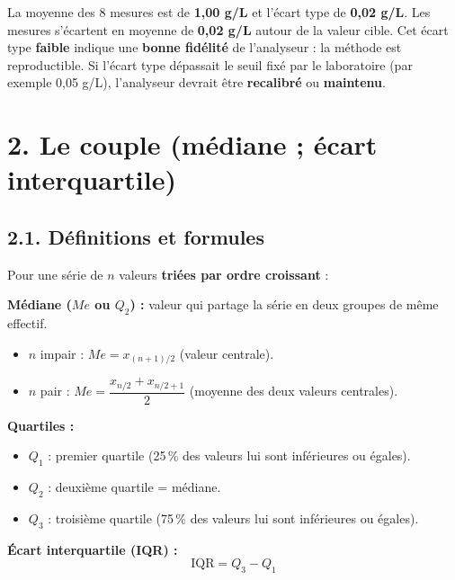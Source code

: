 \documentclass[11pt,a4paper]{article}
\begin{document}
\begin{interpretation}
La moyenne des 8 mesures est de \textbf{1,00 g/L} et l'écart type de \textbf{0,02 g/L}. Les mesures s'écartent en moyenne de \textbf{0,02 g/L} autour de la valeur cible. Cet écart type \textbf{faible} indique une \textbf{bonne fidélité} de l'analyseur : la méthode est reproductible. Si l'écart type dépassait le seuil fixé par le laboratoire (par exemple 0,05 g/L), l'analyseur devrait être \textbf{recalibré} ou \textbf{maintenu}.
\end{interpretation}

\newpage

\section*{2. Le couple (médiane ; écart interquartile)}

\subsection*{2.1. Définitions et formules}

\begin{rappel}
Pour une série de $n$ valeurs \textbf{triées par ordre croissant} :

\vspace{0.2cm}
\textbf{Médiane ($Me$ ou $Q_2$) :} valeur qui partage la série en deux groupes de même effectif.
\begin{itemize}[leftmargin=*]
  \item $n$ impair : $Me = x_{(n+1)/2}$ (valeur centrale).
  \item $n$ pair : $Me = \dfrac{x_{n/2} + x_{n/2+1}}{2}$ (moyenne des deux valeurs centrales).
\end{itemize}

\vspace{0.2cm}
\textbf{Quartiles :}
\begin{itemize}[leftmargin=*]
  \item $Q_1$ : premier quartile (25\,\% des valeurs lui sont inférieures ou égales).
  \item $Q_2$ : deuxième quartile = médiane.
  \item $Q_3$ : troisième quartile (75\,\% des valeurs lui sont inférieures ou égales).
\end{itemize}

\vspace{0.2cm}
\textbf{Écart interquartile (IQR) :}
\[
\text{IQR} = Q_3 - Q_1
\]
\end{rappel}
\end{document}
